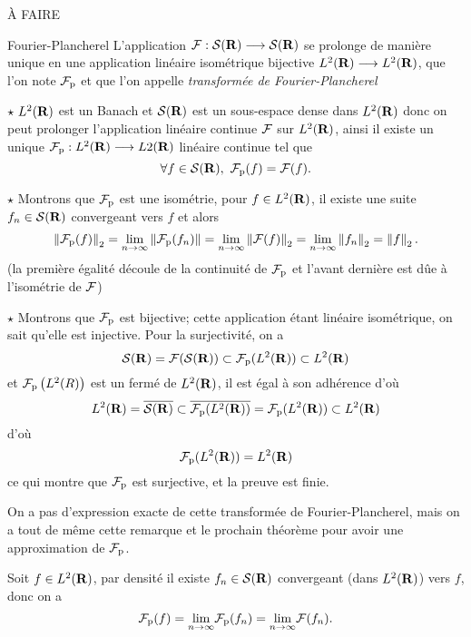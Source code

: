 \documentclass[a4paper,11pt, twoside]{article}
\begin{document}
\begin{Proof}
  À FAIRE
\end{Proof}


\begin{thC}{Fourier-Plancherel}
  L'application $\mathcal F : \mathcal S(\mathbf R)\longrightarrow \mathcal S(\mathbf R)$ se prolonge de manière unique en une application linéaire isométrique bijective $L^2(\mathbf R)\longrightarrow L^2(\mathbf R)$, que l'on note $\mathcal F_\text{p}$ et que l'on appelle \emph{transformée de Fourier-Plancherel}
\end{thC}


\begin{Proof}
  $\star\ L^2(\mathbf R)$ est un Banach et $\mathcal S(\mathbf R)$ est un sous-espace dense dans $L^2(\mathbf R)$ donc on peut prolonger l'application linéaire continue $\mathcal F$ sur $L^2(\mathbf R)$, ainsi il existe un unique $\mathcal F_\text{p}:L^2(\mathbf R)\longrightarrow L 2(\mathbf R)$ linéaire continue tel que 
  $$\forall f\in\S(\R),\ \F_\text{p}(f)=\F(f).$$

  $\star$ Montrons que $\mathcal F_\text{p}$ est une isométrie, pour $f\in L^2(\mathbf R)$, il existe une suite $f_n\in \mathcal S(\mathbf R)$ convergeant vers $f$ et alors 
  $$\left\lVert\mathcal F_\text{p}(f)\right\rVert_2=\underset{n\to\infty}{\mathrm{lim}} \left\lVert\mathcal F_\text{p}(f_n)\right\rVert=\underset{n\to\infty}{\mathrm{lim}}\left\lVert\mathcal F(f)\right\rVert_2=\underset{n\to\infty}{\mathrm{lim}}\left\lVert f_n\right\rVert_2=\left\lVert f\right\rVert_2.$$
  (la première égalité découle de la continuité de $\mathcal F_\text{p}$ et l'avant dernière est dûe à l'isométrie de $\mathcal F$)

  $\star$ Montrons que $\mathcal F_\text{p}$ est bijective; cette application étant linéaire isométrique, on sait qu'elle est injective. Pour la surjectivité, on a
  $$\mathcal S(\mathbf R)=\mathcal F(\mathcal S(\mathbf R))\subset \mathcal F_{\text{p}}(L^2(\mathbf R))\subset L^2(\mathbf R)$$
  et $\mathcal F_\text{p}\left(L^2(R)\right)$ est un fermé de $L^2(\mathbf R)$, il est égal à son adhérence d'où
  $$L^2(\mathbf R)=\overline{\mathcal S(\mathbf R)}\subset \overline{\mathcal F_{\text{p}}(L^2(\mathbf R))}=\mathcal F_{\text{p}}(L^2(\mathbf R))\subset L^2(\mathbf R)$$
  d'où 
  $$\mathcal F_{\text{p}}(L^2(\mathbf R))=L^2(\mathbf R)$$
  ce qui montre que $\mathcal F_{\text{p}}$ est surjective, et la preuve est finie.
\end{Proof}


On a pas d'expression exacte de cette transformée de Fourier-Plancherel, mais on a tout de même cette remarque et le prochain théorème pour avoir une approximation de $\mathcal F_\text{p}$.\\


\begin{RQ}
  Soit $f\in L^2(\mathbf R)$, par densité il existe $f_n\in \mathcal S(\mathbf R)$ convergeant (dans $L^2(\mathbf R)$) vers $f$, donc on a 
  $$\mathcal F_\text{p}(f)=\underset{n\to\infty}{\mathrm{lim}}\mathcal F_\text{p}(f_n)=\underset{n\to\infty}{\mathrm{lim}}\mathcal F(f_n).$$
\end{RQ}
\end{document}
